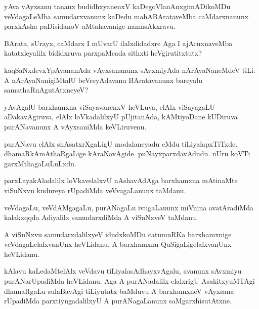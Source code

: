 \documentclass{article}
\begin{document}
\begin{mn}
yAva vAyxsanu tananx budidhxyanenxV kaDegoVlanAnxgimADikoMDu
veVdagaLeMba samudarxvanunx kaDedu mahABArataveMba caMdarxnanunx
parxkAsha paDisidanoV aMtahavanige namasAkxravu.
\end{mn}

\begin{mn}
BArata, sUrayx, caMdarx I mUvarU ilalxdidadxre Aga I ajAcnxnaveMba
katatxleyalilx bididxruva parxpaMcada sithxti heVgirutitxtutx?
\end{mn}

\begin{mn}
kaqSaNxdevxYpAyananAda vAyxsananunx sAvxmiyAda nArAyaNaneMdeV tiLi. A
nArAyaNanigiMtalU beVreyAdavanu BAratavanunx bareyalu samathaRnAgutAtxneyeV?
\end{mn}

\begin{mn}
yAvAgalU barxhamxna viSayavanenxV heVLuva, elAlx viSayagaLU
aDakavAgiruva, elAlx loVkadalilxyU pUjitanAda, kAMtiyoDane kUDiruva
purANavanunx A vAyxsaniMda keVLiruvenu.
\end{mn}

\begin{mn}
purANavu elAlx shAsatxrXgaLigU modalaneyadu eMdu
tiLiyalapxTiTxde. dhamaRkAmAthaRgaLige
kAraNavAgide. puNayxparxdavAdudu. nUru koVTi garxMthagaLuLuLxdu.
\end{mn}

\begin{mn}
parxLayakAladalilx loVkavelalxvU nAshavAdAga barxhamxna mAtinaMte
viSuNxvu kudureya rUpadiMda veVvagaLanunx taMdanu.
\end{mn}

\begin{mn}
veVdagaLu, veVdAMgagaLu, purANagaLu ivugaLanunx miVnina avatAradiMda
kalakxqqda Adiyalilx samudarxdiMda A viSuNxveV taMdanu.
\end{mn}

\begin{mn}
A viSuNxvu samudarxdalilxyeV idudxkoMDu catumuRKa barxhamxnige
veVdagaLelalxvanUnx heVLidanu. A barxhamxnu QuSigaLigelalxvanUnx heVLidanu.
\end{mn}

\begin{mn}
kAlavu kaLedaMtelAlx veVdavu tiLiyalasAdhayxvAgalu, avanunx sAvxmiyu
purANarUpadiMda heVLidanu. Aga A purANadalilx elalxrigU AsakitxyuMTAgi
dhamaRgaLu sulaBavAgi tiLiyutatx baMduvu A barxhamxneV vAyxsana
rUpadiMda parxtiyugadalilxyU A purANagaLanunx saMgarxhisutAtxne.
\end{mn}
\end{document}
